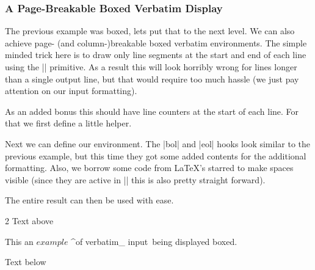 \subsubsection{A Page-Breakable Boxed Verbatim Display}
The previous example was boxed, lets put that to the next level. We can also
achieve page- (and column-)breakable boxed verbatim environments. The simple
minded trick here is to draw only line segments at the start and end of each
line using the |\vrule| primitive. As a result this will look horribly wrong for
lines longer than a single output line, but that would require too much hassle
(we just pay attention on our input formatting).

As an added bonus this should have line counters at the start of each line. For
that we first define a little helper.
\begin{ex}
  \newcount\myline
  \newcommand\linecounting
    {%
      \advance\myline1
      \textcolor[gray]{.7}{\footnotesize\the\myline}%
      \quad
    }
\end{ex}
Next we can define our environment. The |bol| and |eol| hooks look similar to
the previous example, but this time they got some added contents for the
additional formatting. Also, we borrow some code from \LaTeX's starred
 to make spaces visible (since they are active in |\enverb| this
is also pretty straight forward).
\begin{ex}
  \newenvironment{myenv}
    {%
      \enverb
        {
           bol=\noindent\strut\vrule\hskip\fboxsep\linecounting
          ,eol=\hfill\hskip\fboxsep\vrule\strut\par
        }%
    }
    {%
      \medskip
      \hrule
      \ttfamily\frenchspacing
      \UseName{@setupverbvisiblespace}\UseName{@vobeyspaces}%
      \enverbBody
      \hrule
      \medskip
    }
\end{ex}
The entire result can then be used with ease.
\begin{ex}[restore,same-line=.38]
  \begin{multicols}{2}
    Text above
    \begin{myenv}
      This \is
      {an} $example$
      ^of verbatim_
      input\, being
      displayed boxed.
    \end{myenv}
    Text below
  \end{multicols}
\end{ex}

